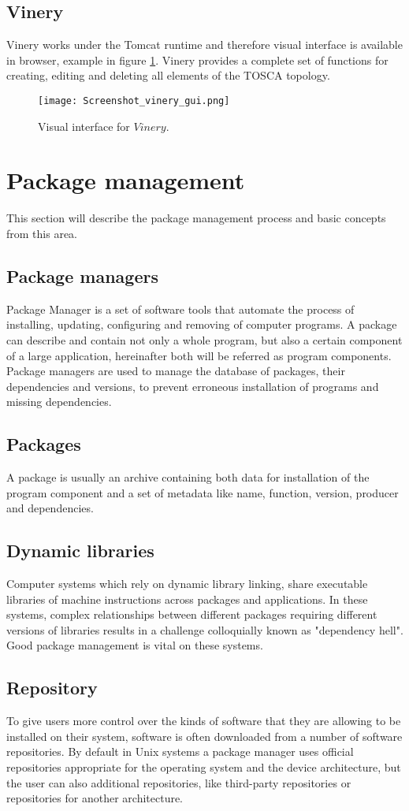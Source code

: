\subsection*{Vinery}\label{subs:vine}
Vinery works under the Tomcat runtime and therefore visual interface is available in browser, example in figure \ref{fig:vinery_gui}. Vinery provides a complete set of functions for creating, editing and deleting all elements of the TOSCA topology. 
\begin{figure}[ht]   
	\centering
	\texttt{[image: Screenshot\_vinery\_gui.png]}
	\caption{Visual interface for $Vinery$.}
	\label{fig:vinery_gui}
\end{figure}
\section{Package management} \label{sec:pm}
This section will describe the package management process and basic concepts from this area.
\subsection*{Package managers}
Package Manager is a set of software tools that automate the process of installing, updating, configuring and removing of computer programs.
A package can describe and contain not only a whole program, but also a certain component of a large application, hereinafter both will be referred as program components.
Package managers are used to manage the database of packages, their dependencies and versions, to prevent erroneous installation of programs and missing dependencies.
\subsection*{Packages}
A package is usually an archive containing both data for installation of the program component and a set of metadata like name, function, version, producer and dependencies.
\subsection*{Dynamic libraries}
Computer systems which rely on dynamic library linking, share executable libraries of machine instructions across packages and applications. 
In these systems, complex relationships between different packages requiring different versions of libraries results in a challenge colloquially known as "dependency hell".
Good package management is vital on these systems.
\subsection*{Repository}
To give users more control over the kinds of software that they are allowing to be installed on their system, software is often downloaded from a number of software repositories.
By default in Unix systems a package manager uses official repositories appropriate for the operating system and the device architecture, but the user can also additional repositories, like third-party repositories or repositories for another architecture.
